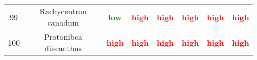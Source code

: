 \documentclass{report}\usepackage[]{graphicx}\usepackage[]{color}
\begin{document}
\begin{table}[ht]
{\begin{tabular}{cccccccc}
   99 & Rachycentron canadum & \textcolor{green}{\textbf{low}} & \textcolor{red}{\textbf{high}} & \textcolor{red}{\textbf{high}} & \textcolor{red}{\textbf{high}} & \textcolor{red}{\textbf{high}} & \textcolor{red}{\textbf{high}} \\ 
  100 & Protonibea diacanthus & \textcolor{red}{\textbf{high}} & \textcolor{red}{\textbf{high}} & \textcolor{red}{\textbf{high}} & \textcolor{red}{\textbf{high}} & \textcolor{red}{\textbf{high}} & \textcolor{red}{\textbf{high}} \\ 
   \hline
\end{tabular}
}
\end{table}

\clearpage
\newpage

\setlength{\tabcolsep}{5pt}

\end{document}
